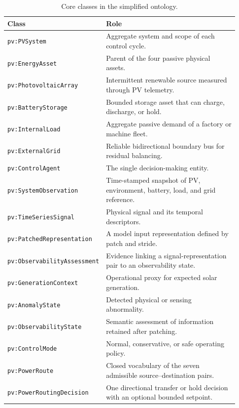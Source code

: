 \documentclass[
	letterpaper,
	10pt,
	unnumberedsections,
	twoside,
]{LTJournalArticle}
\newcommand{\pv}[1]{\texttt{pv:#1}}
\begin{document}
\begin{table}[H]
\centering
\small
\begin{tabular}{@{}L{0.29\linewidth}L{0.64\linewidth}@{}}
\toprule
\textbf{Class} & \textbf{Role} \\
\midrule
\pv{PVSystem} & Aggregate system and scope of each control cycle. \\
\pv{EnergyAsset} & Parent of the four passive physical assets. \\
\pv{PhotovoltaicArray} & Intermittent renewable source measured through PV telemetry. \\
\pv{BatteryStorage} & Bounded storage asset that can charge, discharge, or hold. \\
\pv{InternalLoad} & Aggregate passive demand of a factory or machine fleet. \\
\pv{ExternalGrid} & Reliable bidirectional boundary bus for residual balancing. \\
\pv{ControlAgent} & The single decision-making entity. \\
\pv{SystemObservation} & Time-stamped snapshot of PV, environment, battery, load, and grid reference. \\
\pv{TimeSeriesSignal} & Physical signal and its temporal descriptors. \\
\pv{PatchedRepresentation} & A model input representation defined by patch and stride. \\
\pv{ObservabilityAssessment} & Evidence linking a signal-representation pair to an observability state. \\
\pv{GenerationContext} & Operational proxy for expected solar generation. \\
\pv{AnomalyState} & Detected physical or sensing abnormality. \\
\pv{ObservabilityState} & Semantic assessment of information retained after patching. \\
\pv{ControlMode} & Normal, conservative, or safe operating policy. \\
\pv{PowerRoute} & Closed vocabulary of the seven admissible source--destination pairs. \\
\pv{PowerRoutingDecision} & One directional transfer or hold decision with an optional bounded setpoint. \\
\bottomrule
\end{tabular}
\caption{Core classes in the simplified ontology.}
\label{tab:classes}
\end{table}
\end{document}

